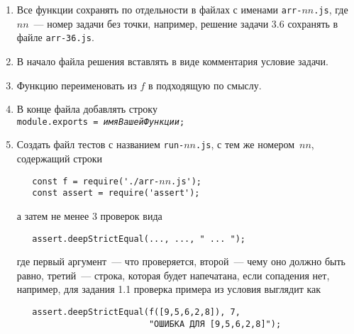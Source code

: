 \documentclass{article}
\begin{document}
\medskip

\begin{enumerate}[nolistsep]
    \item
    Все функции сохранять по отдельности в файлах с именами \texttt{arr-$nn$.js}, где $nn$~--- номер задачи без точки, например, решение задачи 3.6 сохранять в файле \texttt{arr-36.js}.
    \item
    В начало файла решения вставлять в виде комментария условие задачи. 
    \item
    Функцию переименовать из $f$ в подходящую по смыслу. 
    \item
    В конце файла добавлять строку
    \\[.7mm]
    \texttt{module.exports = \textit{имяВашейФункции};}
    \item
    Создать файл тестов с названием \texttt{run-$nn$.js}, с тем же номером~$nn$, содержащий строки

    \smallskip
    \verb!   const f = require('./arr-!$nn$\verb!.js');!\\
    \verb!   const assert = require('assert');!

    \smallskip
    \noindent
    а затем не менее 3 проверок вида 
    
    \smallskip
    \verb!   assert.deepStrictEqual(..., ..., " ... ");!

    \smallskip
    \noindent
    где первый аргумент~--- что проверяется, второй~--- чему оно должно быть равно,
    третий~--- строка, которая будет напечатана, если сопадения нет, например, для задания 1.1
    проверка примера из условия выглядит как

    \smallskip
    \verb!   assert.deepStrictEqual(f([9,5,6,2,8]), 7,!\\
    \verb!                          "ОШИБКА ДЛЯ [9,5,6,2,8]");!

\end{enumerate}
\end{document}
